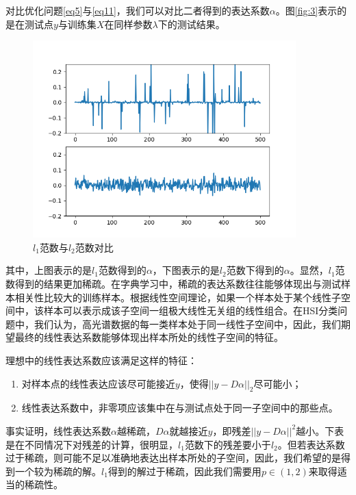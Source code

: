 \documentclass[12pt,a4paper]{article}
\begin{document}
对比优化问题\eqref{eq5}与\eqref{eq11}，我们可以对比二者得到的表达系数$\alpha$。图\eqref{fig:3}表示的是在测试点$y$与训练集$X$在同样参数$\lambda$下的测试结果。
\begin{figure}[H] 
\center
\includegraphics[width=4in]{l2_vs_l1.png} 
\caption{$l_{1}$范数与$l_{2}$范数对比}
\label{fig:3} 
\end{figure}
其中，上图表示的是$l_{1}$范数得到的$\alpha$，下图表示的是$l_{2}$范数下得到的$\alpha$。显然，$l_{1}$范数得到的结果更加稀疏。在字典学习中，稀疏的表达系数往往能够体现出与测试样本相关性比较大的训练样本。根据线性空间理论，如果一个样本处于某个线性子空间中，该样本可以表示成该子空间一组极大线性无关组的线性组合。在HSI分类问题中，我们认为，高光谱数据的每一类样本处于同一线性子空间中，因此，我们期望最终的线性表达系数能够体现出样本所处的线性子空间的特征。

理想中的线性表达系数应该满足这样的特征：
\begin{enumerate}[(1)]
\item 对样本点的线性表达应该尽可能接近$y$，使得$||y - D\alpha||_{2}$尽可能小；
\item 线性表达系数中，非零项应该集中在与测试点处于同一子空间中的那些点。
\end{enumerate}

事实证明，线性表达系数$\alpha$越稀疏，$D\alpha$就越接近$y$，即残差$||y - D\alpha||^{2}$越小。下表是在不同情况下对残差的计算，很明显，$l_{1}$范数下的残差要小于$l_{2}$。但若表达系数过于稀疏，则可能不足以准确地表达出样本所处的子空间，因此，我们希望的是得到一个较为稀疏的解。$l_{1}$得到的解过于稀疏，因此我们需要用$p \in (1, 2)$来取得适当的稀疏性。
\end{document}
